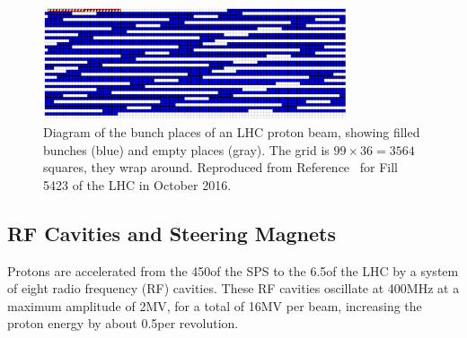 \begin{figure}[tpb]
  \centering
  \includegraphics[width=0.8\textwidth]{figures/cms/Fill5423BunchPattern.png}
  \caption{Diagram of the bunch places of an LHC proton beam, showing filled bunches (blue) and empty places (gray). The grid is $99 \times 36 = 3564$ squares, \ie they wrap around. Reproduced from Reference~\cite{CMSWBM:Fill5423} for Fill 5423 of the LHC in October 2016.}
  \label{cms:lhcbunchpattern}
\end{figure}

\subsection{RF Cavities and Steering Magnets}
Protons are accelerated from the 450\GeV of the SPS to the 6.5\TeV of the LHC by a system of eight radio frequency (RF) cavities.
These RF cavities oscillate at 400\unit{MHz} at a maximum amplitude of 2\unit{MV}, for a total of 16\unit{MV} per beam, increasing the proton energy by about 0.5\MeV per revolution.

